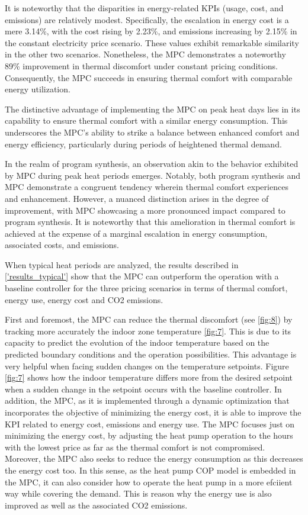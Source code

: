 It is noteworthy that the disparities in energy-related KPIs (usage, cost, and emissions) are relatively modest. Specifically, the escalation in energy cost is a mere 3.14\%, with the cost rising by 2.23\%, and emissions increasing by 2.15\% in the constant electricity price scenario. These values exhibit remarkable similarity in the other two scenarios. Nonetheless, the MPC demonstrates a noteworthy 89\% improvement in thermal discomfort under constant pricing conditions. Consequently, the MPC succeeds in ensuring thermal comfort with comparable energy utilization.

The distinctive advantage of implementing the MPC on peak heat days lies in its capability to ensure thermal comfort with a similar energy consumption. This underscores the MPC's ability to strike a balance between enhanced comfort and energy efficiency, particularly during periods of heightened thermal demand.

In the realm of program synthesis, an observation akin to the behavior exhibited by MPC during peak heat periods emerges. Notably, both program synthesis and MPC demonstrate a congruent tendency wherein thermal comfort experiences and enhancement. However, a nuanced distinction arises in the degree of improvement, with MPC showcasing a more pronounced impact compared to program synthesis. It is noteworthy that this amelioration in thermal comfort is achieved at the expense of a marginal escalation in energy consumption, associated costs, and emissions.

When typical heat periods are analyzed, the results described in \ref{'results_typical'} show that the MPC can outperform the operation with a baseline controller for the three pricing scenarios in terms of thermal comfort, energy use, energy cost and CO2 emissions. 

First and foremost, the MPC can reduce the thermal discomfort (see \ref{fig:8}) by tracking more accurately the indoor zone temperature \ref{fig:7}. This is due to its capacity to predict the evolution of the indoor temperature based on the predicted boundary conditions and the operation possibilities. This advantage is very helpful when facing sudden changes on the temperature setpoints. Figure \ref{fig:7} shows how the indoor temperature differs more from the desired setpoint when a sudden change in the setpoint occurs with the baseline controller. In addition, the MPC, as it is implemented through a dynamic optimization that incorporates the objective of minimizing the energy cost, it is able to improve the KPI related to energy cost, emissions and energy use. The MPC focuses just on minimizing the energy cost, by adjusting the heat pump operation to the hours with the lowest price as far as the thermal comfort is not compromised. Moreover, the MPC also seeks to reduce the energy consumption as this decreases the energy cost too. In this sense, as the heat pump COP model is embedded in the MPC, it can also consider how to operate the heat pump in a more efciient way while covering the demand. This is reason why the energy use is also improved as well as the associated CO2 emissions.

